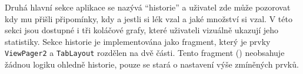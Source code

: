 \documentclass[../TakeYourPill.tex]{subfiles}
\begin{document}
Druhá hlavní sekce aplikace se nazývá \enquote{historie} a uživatel zde může pozorovat kdy mu přišli připomínky, kdy a jestli si lék vzal a jaké množství si vzal. V této sekci jsou dostupné i tři koláčové grafy, které uživateli vizuálně ukazují jeho statistiky. Sekce historie je implementována jako fragment, který je prvky \texttt{ViewPager2} a \texttt{TabLayout} rozdělen na dvě části. Tento fragment () neobsahuje žádnou logiku ohledně historie, pouze se stará o nastavení výše zmíněných prvků.

\end{document}
